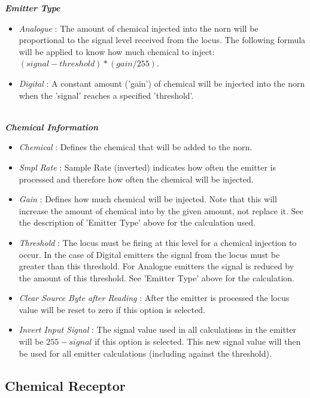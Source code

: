 \documentclass[11pt,twoside,a4paper]{article}
\begin{document}
\textbf{\textit{Emitter Type}}
\begin{itemize}
	\item[] \emph{Analogue} : The amount of chemical injected into the norn will be proportional to the signal level received from the locus. The following formula will be applied to know how much chemical to inject: $(signal - threshold) * (gain / 255)$.
	\item[] \emph{Digital} : A constant amount ('gain') of chemical will be injected into the norn when the 'signal' reaches a specified 'threshold'. 
\end{itemize}~\\

\textbf{\textit{Chemical Information}}
\begin{itemize}
	\item[] \emph{Chemical} : Defines the chemical that will be added to the norn.
	\item[] \emph{Smpl Rate} : Sample Rate (inverted) indicates how often the emitter is processed and therefore how often the chemical will be injected. %
	\item[] \emph{Gain} : Defines how much chemical will be injected. Note that this will increase the amount of chemical into by the given amount, not replace it. See the description of 'Emitter Type' above for the calculation used.
	\item[] \emph{Threshold} : The locus must be firing at this level for a chemical injection to occur. In the case of Digital emitters the signal from the locus must be greater than this threshold. For Analogue emitters the signal is reduced by the amount of this threshold. See 'Emitter Type' above for the calculation. 
	\item[] \emph{Clear Source Byte after Reading} : After the emitter is processed the locus value will be reset to zero if this option is selected.
	\item[] \textit{Invert Input Signal} : The signal value used in all calculations in the emitter will be $255-signal$ if this option is selected. This new signal value will then be used for all emitter calculations (including against the threshold).
\end{itemize}


\subsection{Chemical Receptor} %
\end{document}
